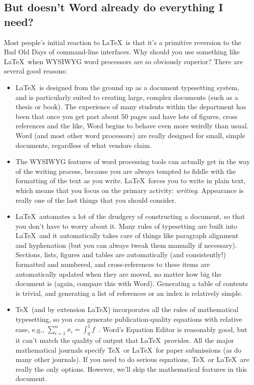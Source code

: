 \documentclass[12pt,a4paper,pdftex]{article}
\begin{document}
\subsection{But doesn't Word already do everything I need?}
\label{sec-Word}

Most people's initial reaction to \LaTeX\ is that it's a primitive reversion to the Bad Old Days of command-line interfaces. Why should you use something like \LaTeX\ when WYSIWYG word processors are so obviously superior? There are several good reasons:

\begin{itemize}

	\item \LaTeX\ is designed from the ground up as a document typesetting system, and is particularly suited to creating large, complex documents (such as a thesis or book). The experience of many students within the department has been that once you get past about 50 pages and have lots of figures, cross references and the like, Word begins to behave even more weirdly than usual. Word (and most other word processors) are really designed for small, simple documents, regardless of what vendors claim.
	
	\item The WYSIWYG features of word processing tools can actually get in the way of the writing process, because you are always tempted to fiddle with the formatting of the text as you write. \LaTeX\ forces you to write in plain text, which means that you focus on the primary activity: \emph{writing}. Appearance is really one of the last things that you should consider.
	
	\item \LaTeX\ automates a lot of the drudgery of constructing a document, so that you don't have to worry about it. Many rules of typesetting are built into \LaTeX\, and it automatically takes care of things like paragraph alignment and hyphenation (but you can always tweak them manually if necessary). Sections, lists, figures and tables are automatically (and consistently!) formatted and numbered, and cross-references to these items are automatically updated when they are moved, no matter how big the document is (again, compare this with Word). Generating a table of contents is trivial, and generating a list of references or an index is relatively simple.
	
	\item \TeX\ (and by extension \LaTeX) incorporates all the rules of mathematical typesetting, so you can generate publication-quality equations with relative ease, e.g., \(\sum_{i=1}^{n} x_{i} = \int_{0}^{1} f\)~\cite{UsersGuide}. Word's Equation Editor is reasonably good, but it can't match the quality of output that \LaTeX\ provides. All the major mathematical journals specify \TeX\ or \LaTeX\ for paper submissions (as do many other journals). If you need to do serious equations, \TeX\ or \LaTeX\ are really the only options. However, we'll skip the mathematical features in this document.
	

\end{itemize}
\end{document}
